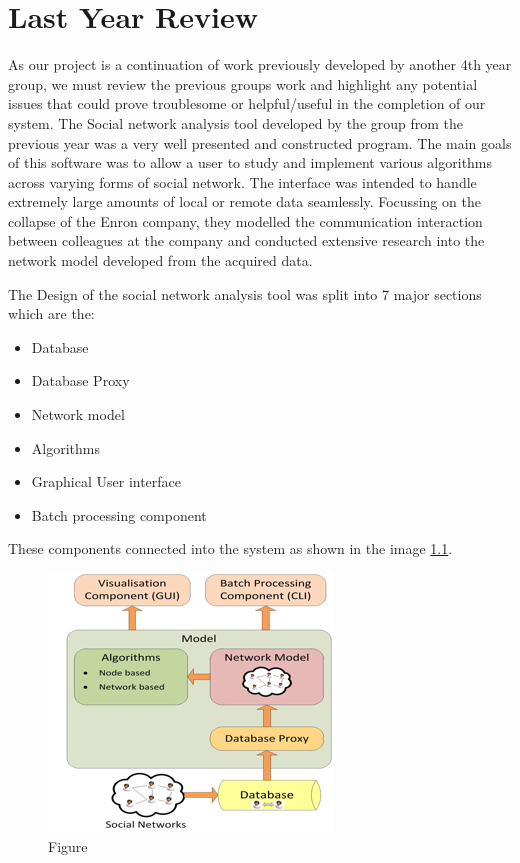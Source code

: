 \chapter{Last Year Review}

As our project is a continuation of work previously developed by another 4th year group, we must review the previous groups work and highlight any potential issues that could prove troublesome or helpful/useful in the completion of our system. The Social network analysis tool developed by the group from the previous year was a very well presented and constructed program. The main goals of this software was to allow a user to study and implement various algorithms across varying forms of social network. The interface was intended to handle extremely large amounts of local or remote data seamlessly. Focussing on the collapse of the Enron company, they modelled the communication interaction between colleagues at the company and conducted extensive research into the network model developed from the acquired data. 

The Design of the social network analysis tool was split into 7 major sections which are the:

\begin{itemize}
\item Database
\item Database Proxy
\item Network model
\item Algorithms
\item Graphical User interface
\item Batch processing component
\end{itemize}

These components connected into the system as shown in the image \ref{fig:previous-review-system-diagram}.

\begin{figure}[htbp]
	\centering
	\includegraphics[width=0.4\linewidth]{img/previous_review_system_diagram.png}
	\caption{Figure}
	\label{fig:previous-review-system-diagram}
\end{figure}

